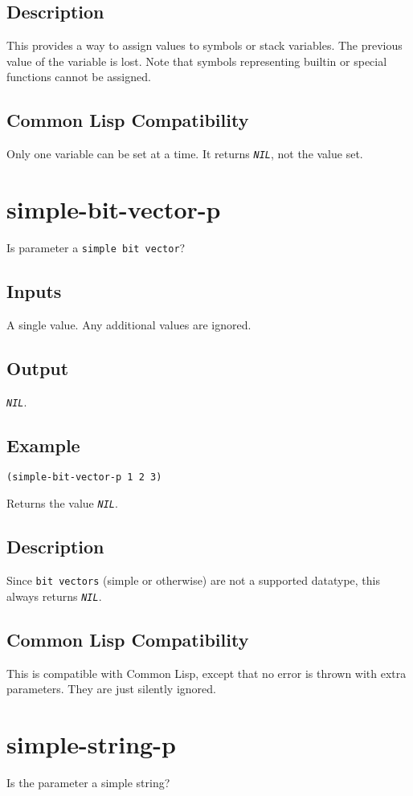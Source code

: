 \documentclass[10pt, openany]{book}
\newcommand{\constant}[1]{\emph{\texttt{#1}}}
\newcommand{\datatype}[1]{\texttt{#1}}
\newcommand{\cl}{Common Lisp}
\begin{document}
\subsection{Description}
This provides a way to assign values to symbols or stack variables.  The previous value of the variable is lost.  Note that symbols representing builtin or special functions cannot be assigned.
\subsection{Common Lisp Compatibility}
Only one variable can be set at a time.  It returns \constant{NIL}, not the value set.

\section{simple-bit-vector-p}
Is parameter a \datatype{simple bit vector}?
\subsection{Inputs}
A single value.  Any additional values are ignored.
\subsection{Output}
\constant{NIL}.
\subsection{Example}
\begin{lstlisting}
(simple-bit-vector-p 1 2 3)
\end{lstlisting}
Returns the value \constant{NIL}.
\subsection{Description}
Since \datatype{bit vectors} (simple or otherwise) are not a supported datatype, this always returns \constant{NIL}.
\subsection{Common Lisp Compatibility}
This is compatible with \cl, except that no error is thrown with extra parameters.  They are just silently ignored.

\section{simple-string-p}
Is the parameter a simple string?
\end{document}
